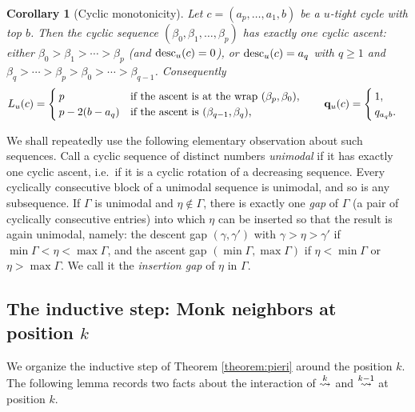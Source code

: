 \documentclass{amsart}
\newtheorem{corollary}[lemma]{Corollary}
\theoremstyle{definition}
\theoremstyle{remark}
\numberwithin{equation}{section}
\newcommand{\xrightsquigarrow}[2][]{%
	\mathrel{\mathop{\rightsquigarrow}\limits^{\scriptstyle #2}%
	\ifx\hfuzz#1\hfuzz\else_{\scriptstyle #1}\fi}%
}
\newcommand{\tom}[1]{\ensuremath{\xrightsquigarrow{#1}}}
\begin{document}
\begin{corollary}[Cyclic monotonicity] \label{corollary:cyclic}
Let $c=(a_p,\ldots,a_1,b)$ be a $u$-tight cycle with top $b$. Then the cyclic sequence $(\beta_0,\beta_1,\ldots,\beta_p)$ has exactly one cyclic ascent: either $\beta_0>\beta_1>\cdots>\beta_p$ (and $\mathrm{desc}_u(c)=0$), or $\mathrm{desc}_u(c)=a_q$ with $q\geq1$ and $\beta_q>\cdots>\beta_p>\beta_0>\cdots>\beta_{q-1}$. Consequently
$$L_u(c)=\begin{cases}p&\text{if the ascent is at the wrap }(\beta_p,\beta_0),\\ p-2(b-a_q)&\text{if the ascent is }(\beta_{q-1},\beta_q),\end{cases}\qquad \mathbf{q}_u(c)=\begin{cases}1,\\ q_{a_qb}.\end{cases}$$
\end{corollary}

We shall repeatedly use the following elementary observation about such sequences. Call a cyclic sequence of distinct numbers \emph{unimodal} if it has exactly one cyclic ascent, i.e.\ if it is a cyclic rotation of a decreasing sequence. Every cyclically consecutive block of a unimodal sequence is unimodal, and so is any subsequence. If $\Gamma$ is unimodal and $\eta\notin\Gamma$, there is exactly one \emph{gap} of $\Gamma$ (a pair of cyclically consecutive entries) into which $\eta$ can be inserted so that the result is again unimodal, namely: the descent gap $(\gamma,\gamma')$ with $\gamma>\eta>\gamma'$ if $\min\Gamma<\eta<\max\Gamma$, and the ascent gap $(\min\Gamma,\max\Gamma)$ if $\eta<\min\Gamma$ or $\eta>\max\Gamma$. We call it the \emph{insertion gap} of $\eta$ in $\Gamma$.

\subsection{The inductive step: Monk neighbors at position $k$}

We organize the inductive step of Theorem \ref{theorem:pieri} around the position $k$. The following lemma records two facts about the interaction of $\tom{k}$ and $\tom{k-1}$ at position $k$.
\end{document}
